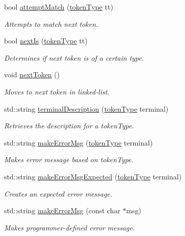 \begin{DoxyCompactItemize}
bool \hyperlink{classParser_a151ffb920a67527813d77bc4ba44c4a7}{attempt\-Match} (\hyperlink{scanner_8h_ab7f9b765cab7ed98e5a7f05690f6a061}{token\-Type} tt)
\begin{DoxyCompactList}\small\item\em Attempts to match next token. \end{DoxyCompactList}\item 
bool \hyperlink{classParser_a67a10b685bd263477b5f59f1923cdec3}{next\-Is} (\hyperlink{scanner_8h_ab7f9b765cab7ed98e5a7f05690f6a061}{token\-Type} tt)
\begin{DoxyCompactList}\small\item\em Determines if next token is of a certain type. \end{DoxyCompactList}\item 
void \hyperlink{classParser_a324a5bb61c9dfc645300a92aecd6fe69}{next\-Token} ()
\begin{DoxyCompactList}\small\item\em Moves to next token in linked-\/list. \end{DoxyCompactList}\item 
std\-::string \hyperlink{classParser_a1f45059a13bc0c98355278a9ca9feed9}{terminal\-Description} (\hyperlink{scanner_8h_ab7f9b765cab7ed98e5a7f05690f6a061}{token\-Type} terminal)
\begin{DoxyCompactList}\small\item\em Retrieves the description for a token\-Type. \end{DoxyCompactList}\item 
std\-::string \hyperlink{classParser_a341bee73e8b1e8558505a237846b16b3}{make\-Error\-Msg} (\hyperlink{scanner_8h_ab7f9b765cab7ed98e5a7f05690f6a061}{token\-Type} terminal)
\begin{DoxyCompactList}\small\item\em Makes error message based on token\-Type. \end{DoxyCompactList}\item 
std\-::string \hyperlink{classParser_ad38e58ddee85db2aecbd3c7bdcf42116}{make\-Error\-Msg\-Expected} (\hyperlink{scanner_8h_ab7f9b765cab7ed98e5a7f05690f6a061}{token\-Type} terminal)
\begin{DoxyCompactList}\small\item\em Creates an expected error message. \end{DoxyCompactList}\item 
std\-::string \hyperlink{classParser_a60c23daeffb7ced92599e4f2555f71c9}{make\-Error\-Msg} (const char $\ast$msg)
\begin{DoxyCompactList}\small\item\em Makes programmer-\/defined error message. \end{DoxyCompactList}\end{DoxyCompactItemize}
